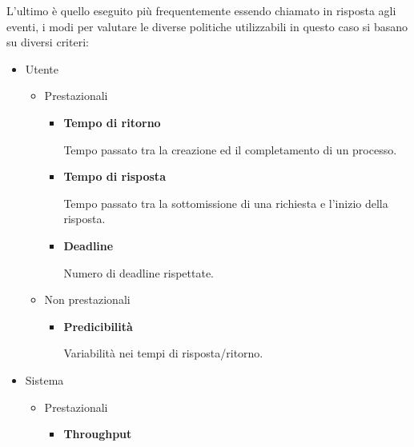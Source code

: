 \documentclass{article}
\begin{document}
\noindent L'ultimo è quello eseguito più frequentemente essendo chiamato in risposta agli eventi, i modi per valutare le diverse politiche utilizzabili in questo caso si basano su diversi criteri:
\begin{itemize}
    \item Utente

        \begin{itemize}
            \item Prestazionali

                \begin{itemize}
                    \item \textbf{Tempo di ritorno}

                        Tempo passato tra la creazione ed il completamento di un processo.
                    
                    \item \textbf{Tempo di risposta}

                        Tempo passato tra la sottomissione di una richiesta e l’inizio della risposta.
                        
                    \item \textbf{Deadline}

                        Numero di deadline rispettate.
                    
                \end{itemize}
            
            \item Non prestazionali

                \begin{itemize}
                    \item \textbf{Predicibilità}

                        Variabilità nei tempi di risposta/ritorno.
                    
                \end{itemize}
            
        \end{itemize}
    
    \item Sistema

        \begin{itemize}
            \item Prestazionali

                \begin{itemize}
                    \item \textbf{Throughput}


\end{itemize}
\end{itemize}
\end{itemize}
\end{document}
